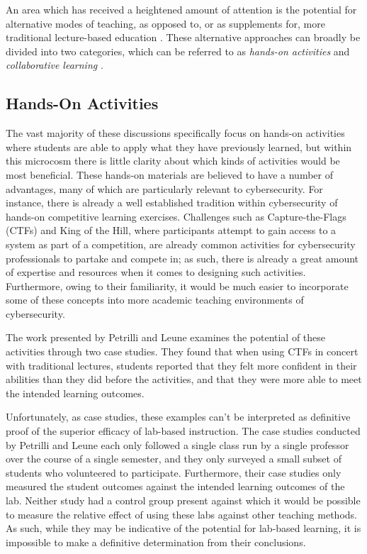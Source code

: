 An area which has received a heightened amount of attention is the potential for alternative modes of teaching, as opposed to, or as supplements for, more traditional lecture-based education \cite{Z-Zeng,N-Eliot,E-Gavas,C-Herr,K-Chung, C-Kussmaul,K-Leune,B-Payne,L-Thomas}. %
These alternative approaches can broadly be divided into two categories, which can be referred to as \emph{hands-on activities} and \emph{collaborative learning} \cite{P-Deshpande,C-Kussmaul,B-Payne}.

\subsection{Hands-On Activities}


    The vast majority of these discussions specifically focus on hands-on activities where students are able to apply what they have previously learned, but within this microcosm there is little clarity about which kinds of activities would be most beneficial. These hands-on materials are believed to have a number of advantages, many of which are particularly relevant to cybersecurity. %
For instance, there is already a well established tradition within cybersecurity of hands-on competitive learning exercises. %
Challenges such as Capture-the-Flags (CTFs) and King of the Hill, where participants attempt to gain access to a system as part of a competition, are already common activities for cybersecurity professionals to partake and compete in; %
as such, there is already a great amount of expertise and resources when it comes to designing such activities. %
Furthermore, owing to their familiarity, it would be much easier to incorporate some of these concepts into more academic teaching environments of cybersecurity.

    The work presented by Petrilli and Leune examines the potential of these activities through two case studies. %
They found that when using CTFs in concert with traditional lectures, students reported that they felt more confident in their abilities than they did before the activities, and that they were more able to meet the intended learning outcomes. 

    Unfortunately, as case studies, these examples can't be interpreted as definitive proof of the superior efficacy of lab-based instruction. %
The case studies conducted by Petrilli and Leune each only followed a single class run by a single professor over the course of a single semester, and they only surveyed a small subset of students who volunteered to participate. 
    Furthermore, their case studies only measured the student outcomes against the intended learning outcomes of the lab. %
Neither study had a control group present against which it would be possible to measure the relative effect of using these labs against other teaching methods. %
As such, while they may be indicative of the potential for lab-based learning, it is impossible to make a definitive determination from their conclusions.

